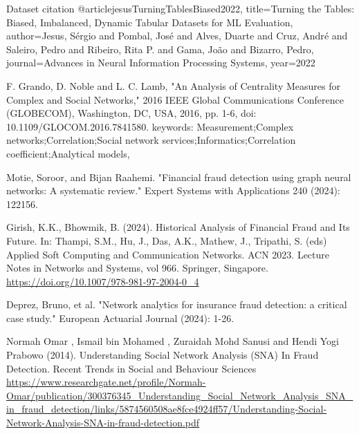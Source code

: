 \documentclass{styles/svproc}
\begin{document}
\newpage
%
%
\begin{thebibliography}{6}
%

Dataset citation
@article{jesusTurningTablesBiased2022,
  title={Turning the {{Tables}}: {{Biased}}, {{Imbalanced}}, {{Dynamic Tabular Datasets}} for {{ML Evaluation}}},
  author={Jesus, S{\'e}rgio and Pombal, Jos{\'e} and Alves, Duarte and Cruz, Andr{\'e} and Saleiro, Pedro and Ribeiro, Rita P. and Gama, Jo{\~a}o and Bizarro, Pedro},
  journal={Advances in Neural Information Processing Systems},
  year={2022}
}

F. Grando, D. Noble and L. C. Lamb, "An Analysis of Centrality Measures for Complex and Social Networks," 2016 IEEE Global Communications Conference (GLOBECOM), Washington, DC, USA, 2016, pp. 1-6, doi: 10.1109/GLOCOM.2016.7841580. keywords: {Measurement;Complex networks;Correlation;Social network services;Informatics;Correlation coefficient;Analytical models},

Motie, Soroor, and Bijan Raahemi. "Financial fraud detection using graph neural networks: A systematic review." Expert Systems with Applications 240 (2024): 122156.

Girish, K.K., Bhowmik, B. (2024). Historical Analysis of Financial Fraud and Its Future. In: Thampi, S.M., Hu, J., Das, A.K., Mathew, J., Tripathi, S. (eds) Applied Soft Computing and Communication Networks. ACN 2023. Lecture Notes in Networks and Systems, vol 966. Springer, Singapore. \url{https://doi.org/10.1007/978-981-97-2004-0_4}

Deprez, Bruno, et al. "Network analytics for insurance fraud detection: a critical case study." European Actuarial Journal (2024): 1-26.

Normah Omar , Ismail bin Mohamed , Zuraidah Mohd Sanusi and Hendi Yogi Prabowo (2014). Understanding Social Network Analysis (SNA) In Fraud Detection. Recent Trends in Social and Behaviour Sciences \url{https://www.researchgate.net/profile/Normah-Omar/publication/300376345_Understanding_Social_Network_Analysis_SNA_in_fraud_detection/links/5874560508ae8fce4924ff57/Understanding-Social-Network-Analysis-SNA-in-fraud-detection.pdf}


\end{thebibliography}
\end{document}
